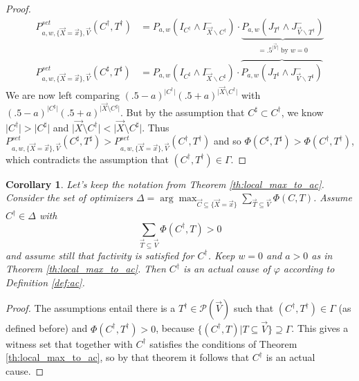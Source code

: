 \documentclass{article}
\newtheorem{corollary}[theorem]{Corollary}
\begin{document}
\begin{proof}
\begin{align}
P^{\mathit{set}}_{a,w, \{\vec{X}  =\vec {x}\}, \vec{V}}(C^\dagger,T^\dagger) & =  P_{a, w}\left(I_{C^\dagger} \wedge I^-_{\vec{X} \backslash C^\dagger}\right) \cdot \underbrace{P_{a,w} \left( J_{T^\dagger}  \wedge J^-_{\vec{V} \backslash T^\dagger} \right)}_{ = .5^{\vert \vec{V} \vert} \text{ by $w=0$}}\\
P^{\mathit{set}}_{a,w, \{\vec{X}=\vec {x}\}, \vec{V}}(C^\sharp,T^\sharp) & =  P_{a, w}\left(I_{C^\sharp} \wedge I^-_{\vec{X} \backslash C^\sharp}  \right) \cdot \overbrace{P_{a,w}  \left(  J_{T^\sharp}  \wedge J^-_{\vec{V} \backslash T^\sharp} \right)}
\end{align}
\noindent We are now left comparing $(.5-a)^{\vert C^\dagger\vert } (.5+a)^{\vert \vec{X}\setminus{C^\dagger}\vert}$ with $(.5-a)^{\vert C^\sharp\vert } (.5+a)^{\vert \vec{X}\setminus{C^\sharp}\vert}$. But by the assumption that $C^\sharp \subset C^\dagger$, we know $\vert C^\dagger\vert > \vert C^\sharp\vert$ and $\vert \vec{X}\setminus{C^\dagger}\vert < \vert \vec{X}\setminus{C^\sharp}\vert$. Thus $P^{\mathit{set}}_{a,w, \{\vec{X}=\vec {x}\}, \vec{V}}(C^\sharp,T^\sharp) > P^{\mathit{set}}_{a,w, \{\vec{X}  =\vec {x}\}, \vec{V}}(C^\dagger,T^\dagger)$ and so $\Phi(C^\sharp, T^\sharp) > \Phi(C^\dagger, T^\dagger)$, which  contradicts the assumption that $(C^\dagger, T^\dagger) \in \Gamma$.
\end{proof}




\begin{corollary} Let's keep the notation from Theorem \ref{th:local_max_to_ac}. Consider the set   of optimizers  $\Delta = \arg\max_{\vec{C} \subseteq \{\vec{X} = \vec{x}\}} \sum_{\vec{T} \subseteq \vec{V}} \Phi(C, T)$.  Assume $C^\dagger\in \Delta$ with \[\sum_{\vec{T} \subseteq \vec{V}} \Phi(C^\dagger, T)>0\] and assume still that factivity is satisfied for $C^\dagger$. Keep $w=0$ and $a>0$  as in Theorem \ref{th:local_max_to_ac}. Then $C^\dagger$ is an actual cause of $\varphi$ according to Definition \ref{def:ac}.
\end{corollary}


\begin{proof}
The assumptions entail there is a $T^\dagger\in \mathcal{P}(\vec{V})$ such that $(C^\dagger, T^\dagger) \in \Gamma$ (as defined before) and $\Phi(C^\dagger, T^\dagger)>0$, because $\{(C^\dagger, T)\vert T\subseteq \vec{V}\} \supseteq \Gamma$. This gives a witness set that together with $C^\dagger$ satisfies the conditions of Theorem \ref{th:local_max_to_ac}, so by that theorem it follows that $C^\dagger$ is an actual cause.
\end{proof}
\end{document}
